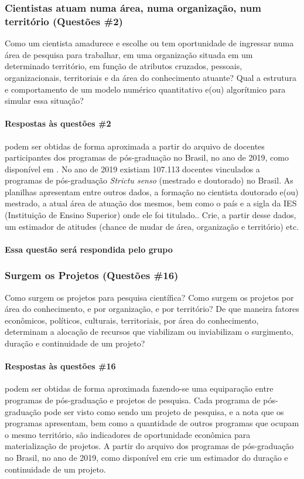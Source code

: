 \subsubsection{Cientistas atuam numa área, numa organização, num território (Questões \#2)}
Como um cientista amadurece e escolhe ou tem oportunidade de ingressar numa área de pesquisa para trabalhar, em uma organização situada em um determinado território, em função de atributos cruzados, pessoais, organizacionais, territoriais e da área do conhecimento atuante? Qual a estrutura e comportamento de um modelo numérico quantitativo e(ou) algorítmico para simular essa situação?

\paragraph{Respostas às questões \#2} podem ser obtidas de forma aproximada a partir do arquivo de docentes participantes dos programas de pós-graduação no Brasil, no ano de 2019, como disponível em \cite{capes_docentes_2020}. No ano de 2019 existiam 107.113 docentes vinculados a programas de pós-graduação \textit{Strictu senso} (mestrado e doutorado) no Brasil. As planilhas apresentam entre outros dados, a formação no cientista doutorado e(ou) mestrado, a atual área de atuação dos mesmos, bem como o país e a sigla da IES (Instituição de Ensino Superior) onde ele foi titulado..
Crie, a partir desse dados, um estimador de atitudes (chance de mudar de área, organização e território) etc.

\paragraph{Essa questão será respondida pelo grupo}


\subsubsection{Surgem os Projetos (Questões \#16)} Como surgem os projetos para pesquisa científica? Como surgem os projetos por área do conhecimento, e por organização, e por território? De que maneira fatores econômicos, políticos, culturais, territoriais, por área do conhecimento, determinam a alocação de recursos que viabilizam ou inviabilizam o surgimento, duração e continuidade de um projeto?

\paragraph{Respostas às questões \#16} podem ser obtidas de forma aproximada fazendo-se uma equiparação entre programas de pós-graduação e projetos de pesquisa. Cada programa de pós-graduação pode ser visto como sendo um projeto de pesquisa, e a nota que os programas apresentam, bem como a quantidade de outros programas que ocupam o mesmo território, são  indicadores de oportunidade econômica para materialização de projetos.
A partir do arquivo dos programas de pós-graduação no Brasil, no ano de 2019, como disponível em \cite{capes_programas_2021} crie um estimador do duração e continuidade de um projeto.

